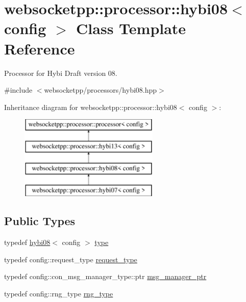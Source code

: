 \hypertarget{classwebsocketpp_1_1processor_1_1hybi08}{}\section{websocketpp\+:\+:processor\+:\+:hybi08$<$ config $>$ Class Template Reference}
\label{classwebsocketpp_1_1processor_1_1hybi08}


Processor for Hybi Draft version 08.  




{\ttfamily \#include $<$websocketpp/processors/hybi08.\+hpp$>$}

Inheritance diagram for websocketpp\+:\+:processor\+:\+:hybi08$<$ config $>$\+:\begin{figure}[H]
\begin{center}
\leavevmode
\includegraphics[height=4.000000cm]{classwebsocketpp_1_1processor_1_1hybi08}
\end{center}
\end{figure}
\subsection*{Public Types}
\begin{DoxyCompactItemize}
\item 
typedef \hyperlink{classwebsocketpp_1_1processor_1_1hybi08}{hybi08}$<$ config $>$ \hyperlink{classwebsocketpp_1_1processor_1_1hybi08_adb295a175e3c45fad340b974c9daa780}{type}
\item 
typedef config\+::request\+\_\+type \hyperlink{classwebsocketpp_1_1processor_1_1hybi08_a5cb5a8054a9e10706e672de379284a2e}{request\+\_\+type}
\item 
typedef config\+::con\+\_\+msg\+\_\+manager\+\_\+type\+::ptr \hyperlink{classwebsocketpp_1_1processor_1_1hybi08_a4ad1477463712031772e8e8a48cdc7b0}{msg\+\_\+manager\+\_\+ptr}
\item 
typedef config\+::rng\+\_\+type \hyperlink{classwebsocketpp_1_1processor_1_1hybi08_af8b10cde566c24d29a94f50716fdcddd}{rng\+\_\+type}
\end{DoxyCompactItemize}
